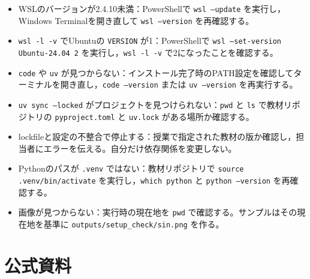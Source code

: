 \begin{itemize}
\item WSLのバージョンが2.4.10未満：PowerShellで \texttt{wsl --update} を実行し，Windows Terminalを開き直して \texttt{wsl --version} を再確認する。

\item \texttt{wsl -l -v} でUbuntuの \texttt{VERSION} が1：PowerShellで \texttt{wsl --set-version Ubuntu-24.04 2} を実行し，\texttt{wsl -l -v} で2になったことを確認する。

\item \texttt{code} や \texttt{uv} が見つからない：インストール完了時のPATH設定を確認してターミナルを開き直し，\texttt{code --version} または \texttt{uv --version} を再実行する。

\item \texttt{uv sync --locked} がプロジェクトを見つけられない：\texttt{pwd} と \texttt{ls} で教材リポジトリの \texttt{pyproject.toml} と \texttt{uv.lock} がある場所か確認する。

\item lockfileと設定の不整合で停止する：授業で指定された教材の版か確認し，担当者にエラーを伝える。自分だけ依存関係を変更しない。

\item Pythonのパスが \texttt{.venv} ではない：教材リポジトリで \texttt{source .venv/bin/activate} を実行し，\texttt{which python} と \texttt{python --version} を再確認する。

\item 画像が見つからない：実行時の現在地を \texttt{pwd} で確認する。サンプルはその現在地を基準に \texttt{outputs/setup\_check/sin.png} を作る。

\end{itemize}

\section{公式資料}

